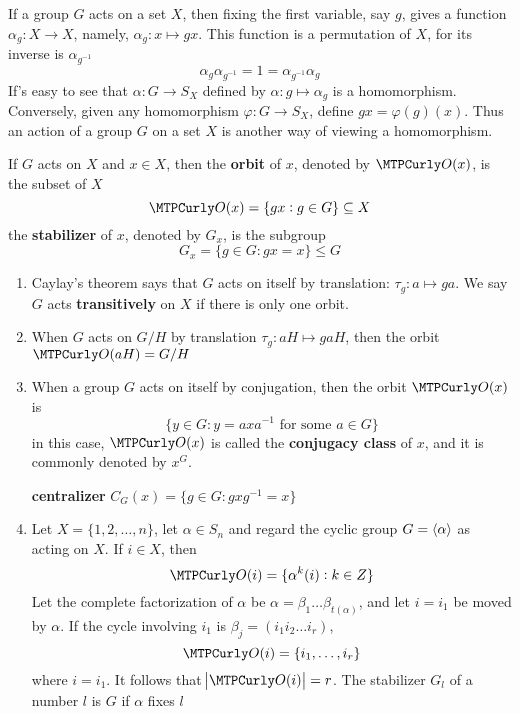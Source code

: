 \documentclass[11pt]{article}
\begin{document}
If a group \(G\) acts on a set \(X\), then fixing the first variable, say \(g\),
gives a function \(\alpha_g:X\to X\), namely, \(\alpha_g:x\mapsto gx\). This
function is a permutation of \(X\), for its inverse is \(\alpha_{g^{-1}}\)
\begin{equation*}
\alpha_g\alpha_{g^{-1}}=1=\alpha_{g^{-1}}\alpha_g
\end{equation*}
If's easy to see that \(\alpha:G\to S_X\) defined by \(\alpha:g\mapsto\alpha_g\)
is a homomorphism. Conversely, given any homomorphism \(\varphi:G\to S_X\),
define \(gx=\varphi(g)(x)\). Thus an action of a group \(G\) on a set \(X\) is
another way of viewing a homomorphism.

\begin{definition}[]
If \(G\) acts on \(X\) and \(x\in X\), then the \textbf{orbit} of \(x\), denoted by
\(\calo(x)\), is the subset of \(X\)
\begin{equation*}
\calo(x)=\{gx:g\in G\}\subseteq X
\end{equation*}
the \textbf{stabilizer} of \(x\), denoted by \(G_x\), is the subgroup
\begin{equation*}
G_x=\{g\in G:gx=x\}\le G
\end{equation*}
\end{definition}

\begin{examplle}[]
\begin{enumerate}
\item Caylay's theorem says that \(G\) acts on itself by translation:
\(\tau_g:a\mapsto ga\).  We say \(G\) acts \textbf{transitively} on \(X\) if there is
only one orbit.
\item When \(G\) acts on \(G/H\) by translation \(\tau_g:aH\mapsto gaH\), then the
orbit \(\calo(aH)=G/H\)
\item When a group \(G\) acts on itself by conjugation, then the orbit  \(\calo(x)\)
is 
\begin{equation*}
\{y\in G:y=axa^{-1}\text{ for some }a\in G\}
\end{equation*}
in this case, \(\calo(x)\) is called the \textbf{conjugacy class} of \(x\), and it is
commonly denoted by \(x^G\).

\textbf{centralizer} \(C_G(x)=\{g\in G:gxg^{-1}=x\}\)
\item Let \(X=\{1,2,\dots,n\}\), let \(\alpha\in S_n\) and regard the cyclic group
\(G=\langle\alpha\rangle\) as acting on \(X\). If \(i\in X\), then
\begin{equation*}
\calo(i)=\{\alpha^k(i):k\in\Z\}
\end{equation*}
Let the complete factorization of \(\alpha\) be \(\alpha=\beta_1\dots\beta_{t(\alpha)}\),
and let \(i=i_1\) be moved by \(\alpha\). If the cycle involving \(i_1\) is
\(\beta_j=(i_1 i_2 \dots i_r)\),
\begin{equation*}
\calo(i)=\{i_1,\dots,i_r\}
\end{equation*}
where \(i=i_1\). It follows that \(\abs{\calo(i)}=r\). The stabilizer \(G_l\) of
a number \(l\) is \(G\) if \(\alpha\) fixes \(l\)
\end{enumerate}
\end{examplle}
\end{document}
